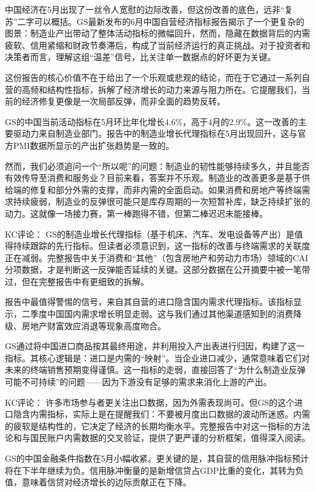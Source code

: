 \documentclass[11pt]{ctexart}
\begin{document}
中国经济在5月出现了一丝令人宽慰的边际改善，但这份改善的底色，远非“复苏”二字可以概括。GS最新发布的6月中国自营经济指标报告揭示了一个更复杂的图景：制造业产出带动了整体活动指标的微幅回升，然而，隐藏在数据背后的内需疲软、信用紧缩和财政节奏滞后，构成了当前经济运行的真正挑战。对于投资者和决策者而言，理解这组“温差”信号，比关注单一数据点的好坏更为关键。

这份报告的核心价值不在于给出了一个乐观或悲观的结论，而在于它通过一系列自营的高频和结构性指标，拆解了经济增长的动力来源与阻力所在。它提醒我们，当前的经济修复更像是一次局部反弹，而非全面的趋势反转。

GS的中国当前活动指标在5月环比年化增长4.6\%，高于4月的2.9\%。这一改善的主要驱动力来自制造业部门。报告中的制造业增长代理指标在5月出现回升，这与官方PMI数据所显示的产出扩张趋势是一致的。

然而，我们必须追问一个“所以呢”的问题：制造业的韧性能够持续多久，并且能否有效传导至消费和服务业？目前来看，答案并不乐观。制造业的改善更多是基于供给端的修复和部分外需的支撑，而非内需的全面启动。如果消费和房地产等终端需求持续疲弱，制造业的反弹很可能只是库存周期的一次短暂补库，缺乏持续扩张的动力。这就像一场接力赛，第一棒跑得不错，但第二棒迟迟未能接棒。

KC评论： GS的制造业增长代理指标（基于机床、汽车、发电设备等产出）是值得持续跟踪的先行指标。但读者必须意识到，这一指标的改善与终端需求的关联度正在减弱。完整报告中关于消费和“其他”（包含房地产和劳动力市场）领域的CAI分项数据，才是判断这一反弹能否延续的关键。这部分数据在公开摘要中被一笔带过，但在完整报告中有更细致的拆解。

报告中最值得警惕的信号，来自其自营的进口隐含国内需求代理指标。该指标显示，二季度中国国内需求增长明显走弱。这与我们通过其他渠道感知到的消费降级、房地产财富效应消退等现象高度吻合。

GS通过将中国进口商品按其最终用途，并利用投入产出表进行归因，构建了这一指标。其核心逻辑是：进口是内需的“映射”。当企业进口减少，通常意味着它们对未来的终端销售预期变得谨慎。这一指标的走弱，直接回答了“为什么制造业反弹可能不可持续”的问题——因为下游没有足够的需求来消化上游的产出。

KC评论： 许多市场参与者更关注出口数据，因为外需表现尚可。但GS的这个进口隐含内需指标，实际上是在提醒我们：不要被月度出口数据的波动所迷惑。内需的疲软是结构性的，它决定了经济的长期均衡水平。完整报告中对这一指标的方法论和与国民账户内需数据的交叉验证，提供了更严谨的分析框架，值得深入阅读。

GS的中国金融条件指数在5月小幅收紧。更关键的是，其自营的信用脉冲指标预计将在下半年继续为负。信用脉冲衡量的是新增信贷占GDP比重的变化，其转为负值，意味着信贷对经济增长的边际贡献正在下降。
\end{document}
